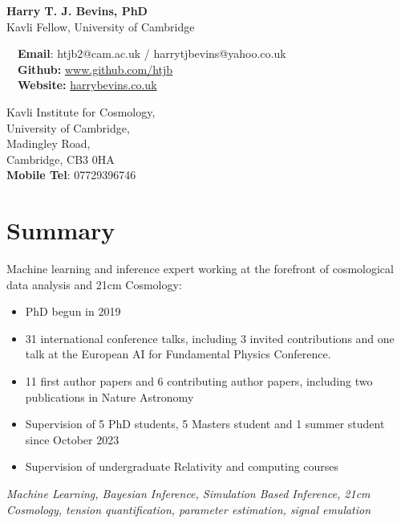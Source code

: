 \documentclass{article}
\begin{document}
\small

\begin{center}
\Large
\textbf{Harry T. J. Bevins, PhD}\\
\large
Kavli Fellow, University of Cambridge
\end{center}

\begin{minipage}[ht]{0.6\linewidth}
	\faEnvelope~~\textbf{Email}: htjb2@cam.ac.uk / harrytjbevins@yahoo.co.uk\\
	\faGithub~~\textbf{Github:} \url{www.github.com/htjb}\\
	\faGlobe~~\textbf{Website:} \url{harrybevins.co.uk}
\end{minipage}
\begin{minipage}[ht]{0.3\linewidth}
	\begin{flushright}
	Kavli Institute for Cosmology, \\
    University of Cambridge,\\
    Madingley Road,\\
    Cambridge, CB3 0HA\\
    \textbf{Mobile Tel}: 07729396746 \\
	\end{flushright}
\end{minipage}

\section*{Summary}

Machine learning and inference expert working at the forefront of cosmological data analysis and 21cm Cosmology:
\begin{itemize}
    \item PhD begun in 2019
    \item 31 international conference talks, including 3 invited contributions and one talk at the European AI for Fundamental Physics Conference.
    \item 11 first author papers and 6 contributing author papers, including two publications in Nature Astronomy
    \item Supervision of 5 PhD students, 5 Masters student and 1 summer student since October 2023
    \item Supervision of undergraduate Relativity and computing courses
    
\end{itemize}

\textit{Machine Learning, Bayesian Inference, Simulation Based Inference, 21cm Cosmology, tension quantification, parameter estimation, signal emulation}
\end{document}
